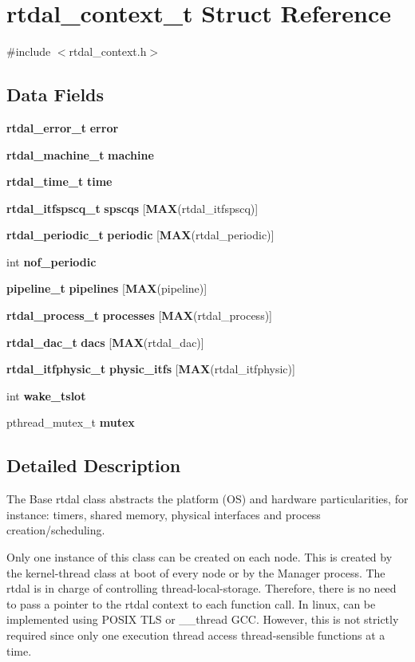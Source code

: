 \section{rtdal\-\_\-context\-\_\-t Struct Reference}
\label{structrtdal__context__t}


{\ttfamily \#include $<$rtdal\-\_\-context.\-h$>$}

\subsection*{Data Fields}
\begin{DoxyCompactItemize}
\item 
{\bf rtdal\-\_\-error\-\_\-t} {\bf error}
\item 
{\bf rtdal\-\_\-machine\-\_\-t} {\bf machine}
\item 
{\bf rtdal\-\_\-time\-\_\-t} {\bf time}
\item 
{\bf rtdal\-\_\-itfspscq\-\_\-t} {\bf spscqs} [{\bf M\-A\-X}(rtdal\-\_\-itfspscq)]
\item 
{\bf rtdal\-\_\-periodic\-\_\-t} {\bf periodic} [{\bf M\-A\-X}(rtdal\-\_\-periodic)]
\item 
int {\bf nof\-\_\-periodic}
\item 
{\bf pipeline\-\_\-t} {\bf pipelines} [{\bf M\-A\-X}(pipeline)]
\item 
{\bf rtdal\-\_\-process\-\_\-t} {\bf processes} [{\bf M\-A\-X}(rtdal\-\_\-process)]
\item 
{\bf rtdal\-\_\-dac\-\_\-t} {\bf dacs} [{\bf M\-A\-X}(rtdal\-\_\-dac)]
\item 
{\bf rtdal\-\_\-itfphysic\-\_\-t} {\bf physic\-\_\-itfs} [{\bf M\-A\-X}(rtdal\-\_\-itfphysic)]
\item 
int {\bf wake\-\_\-tslot}
\item 
pthread\-\_\-mutex\-\_\-t {\bf mutex}
\end{DoxyCompactItemize}


\subsection{Detailed Description}
The Base rtdal class abstracts the platform (O\-S) and hardware particularities, for instance\-: timers, shared memory, physical interfaces and process creation/scheduling.

Only one instance of this class can be created on each node. This is created by the kernel-\/thread class at boot of every node or by the Manager process. The rtdal is in charge of controlling thread-\/local-\/storage. Therefore, there is no need to pass a pointer to the rtdal context to each function call. In linux, can be implemented using P\-O\-S\-I\-X T\-L\-S or \-\_\-\-\_\-thread G\-C\-C. However, this is not strictly required since only one execution thread access thread-\/sensible functions at a time. 

